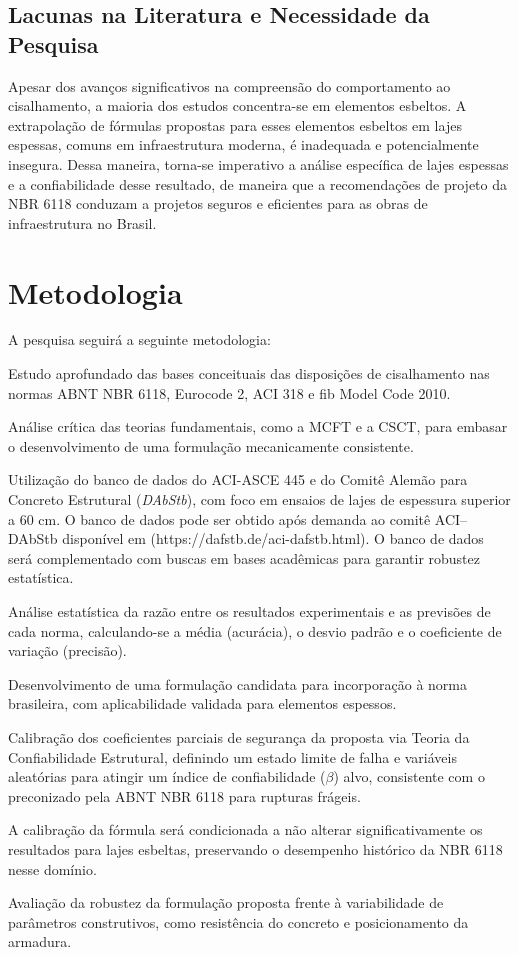 \section{Lacunas na Literatura e Necessidade da Pesquisa}
Apesar dos avanços significativos na compreensão do comportamento ao cisalhamento, a maioria dos estudos concentra-se em elementos esbeltos. A extrapolação de fórmulas propostas para esses elementos esbeltos em lajes espessas, comuns em infraestrutura moderna, é inadequada e potencialmente insegura. Dessa maneira, torna-se imperativo a análise específica de lajes espessas e a confiabilidade desse resultado, de maneira que a recomendações de projeto da NBR 6118 conduzam a projetos seguros e eficientes para as obras de infraestrutura no Brasil.

\chapter{Metodologia}
A pesquisa seguirá a seguinte metodologia:

\begin{alineas}
    \item Estudo aprofundado das bases conceituais das disposições de cisalhamento nas normas ABNT NBR 6118, Eurocode 2, ACI 318 e fib Model Code 2010.
    \item Análise crítica das teorias fundamentais, como a MCFT e a CSCT, para embasar o desenvolvimento de uma formulação mecanicamente consistente.
    \item Utilização do banco de dados do ACI-ASCE 445 e do Comitê Alemão para Concreto Estrutural (\textit{DAbStb}), com foco em ensaios de lajes de espessura superior a 60 cm. O banco de dados pode ser obtido após demanda ao comitê ACI--DAbStb disponível em (https://dafstb.de/aci-dafstb.html). O banco de dados será complementado com buscas em bases acadêmicas para garantir robustez estatística.
    \item Análise estatística da razão entre os resultados experimentais e as previsões de cada norma, calculando-se a média (acurácia), o desvio padrão e o coeficiente de variação (precisão).
    \item Desenvolvimento de uma formulação candidata para incorporação à norma brasileira, com aplicabilidade validada para elementos espessos.
    \item Calibração dos coeficientes parciais de segurança da proposta via Teoria da Confiabilidade Estrutural, definindo um estado limite de falha e variáveis aleatórias para atingir um índice de confiabilidade ($\beta$) alvo, consistente com o preconizado pela ABNT NBR 6118 para rupturas frágeis.
    \item A calibração da fórmula será condicionada a não alterar significativamente os resultados para lajes esbeltas, preservando o desempenho histórico da NBR 6118 nesse domínio.
    \item Avaliação da robustez da formulação proposta frente à variabilidade de parâmetros construtivos, como resistência do concreto e posicionamento da armadura.
\end{alineas}

